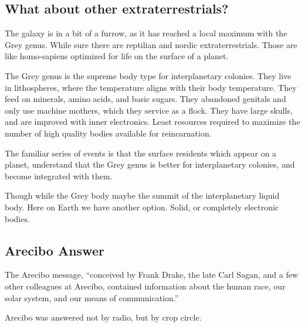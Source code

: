\documentclass{report}
\begin{document}
\subsection{What about other extraterrestrials?}
The galaxy is in a bit of a furrow, as it has reached a local maximum with the
Grey genus. While sure there are reptilian and nordic extraterrestrials. Those
are like homo-sapiens optimized for life on the surface of a planet. 

The Grey genus is the supreme body type for interplanetary colonies. They live
in lithospheres, where the temperature aligns with their body temperature. They
feed on minerals, amino acids, and basic sugars. They abandoned genitals and
only use machine mothers, which they service as a flock. They have large skulls,
and are improved with inner electronics. Least resources
required to maximize the number of high quality bodies available for reincarnation. 

The familiar series of events is that the surface residents which appear on a
planet, understand that the Grey genus is better for interplanetary colonies, and
become integrated with them. 

Though while the Grey body maybe the summit of the interplanetary liquid body.
Here on Earth we have another option. Solid, or completely electronic bodies.

\subsection{Arecibo Answer}
\label{arecibo}

The Arecibo message, ``conceived by Frank Drake, the late Carl Sagan, and a few
other colleagues at Arecibo, contained information about the human race, our
solar system, and our means of communication.''\cite{chilbolton}

Arecibo was answered not by radio, but by crop circle. 
\end{document}
